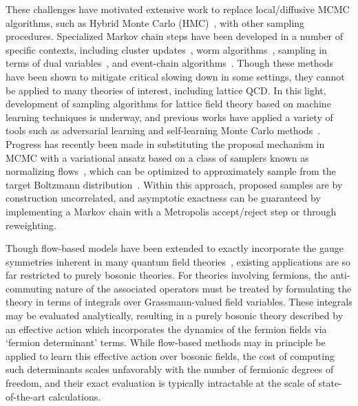 \documentclass[aps,prd,twocolumn,nofootinbib,superscriptaddress,preprintnumbers]{revtex4-1}
\begin{document}
These challenges have motivated extensive work to replace local/diffusive MCMC algorithms, such as Hybrid Monte Carlo (HMC)~\cite{DUANE1987216}, with other sampling procedures. Specialized Markov chain steps have been developed in a number of specific contexts, including cluster updates~\cite{Hoshen:1976zz,Wolff:1987jk,Swendsen:1987ce,Edwards:1988ba,Wolff:1988uh,BrowerTamayo89,Hasenbusch:1989kx,Sinclair:1992vm,Bietenholz:1995zk}, worm algorithms~\cite{Evertz:2000rk,Prokofev:2001ddj,Kawashima:2004}, sampling in terms of dual variables~\cite{Savit:1979ny,Azcoiti:2009md,Gattringer:2015baa}, and event-chain algorithms~\cite{Bernard:2009,Michel:2015,Nishikawa:2015,Hasenbusch:2018ztj,Lei:2018vis}. Though these methods have been shown to mitigate critical slowing down in some settings, they cannot be applied to many theories of interest, including lattice QCD. In this light, development of sampling algorithms for lattice field theory based on machine learning techniques is underway, and previous works have applied a variety of tools such as adversarial learning and self-learning Monte Carlo methods~\cite{PhysRevD.100.011501,Wu_2019,Pawlowski:2018qxs,Nicoli:2020evf,Carrasquilla:2020mas,wang2020continuousmixture,vielhaben2020generative, PhysRevB.95.041101,PhysRevB.95.241104,PhysRevB.97.205140,PhysRevB.96.161102,PhysRevB.97.205140,PhysRevB.98.041102,PhysRevB.102.041124,Nagai:2020jar}. Progress has recently been made in substituting the proposal mechanism in MCMC with a variational ansatz based on a class of samplers known as normalizing flows~\cite{rezende2016variational,dinh2017density,JMLR:v22:19-1028}, which can be optimized to approximately sample from the target Boltzmann distribution~\cite{Albergo:2019eim,Nicoli:2020njz,DelDebbio:2021qwf}. Within this approach, proposed samples are by construction uncorrelated, and asymptotic exactness can be guaranteed by implementing a Markov chain with a Metropolis accept/reject step or through reweighting.

Though flow-based models have been extended to exactly incorporate the gauge symmetries inherent in many quantum field theories~\cite{Kanwar:2020xzo,Boyda:2020hsi}, existing applications are so far restricted to purely bosonic theories. For theories involving fermions, the anti-commuting nature of the associated operators must be treated by formulating the theory in terms of integrals over Grassmann-valued field variables. These integrals may be evaluated analytically, resulting in a purely bosonic theory described by an effective action which incorporates the dynamics of the fermion fields via `fermion determinant' terms. While flow-based methods may in principle be applied to learn this effective action over bosonic fields, the cost of computing such determinants scales unfavorably with the number of fermionic degrees of freedom, and their exact evaluation is typically intractable at the scale of state-of-the-art calculations.
\end{document}

